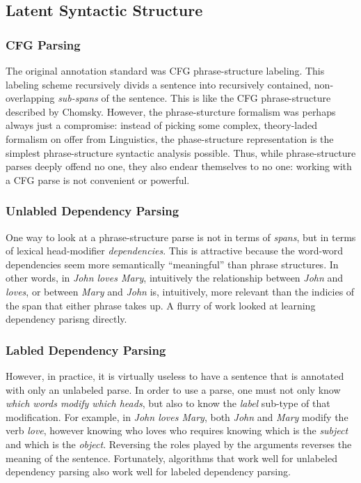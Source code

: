 \documentclass[12pt]{article}
\begin{document}
\subsection{Latent Syntactic Structure}
\subsubsection{CFG Parsing}
The original annotation standard was CFG phrase-structure labeling.
This labeling scheme recursively divids a sentence into recursively contained, non-overlapping {\em sub-spans} of the sentence.
This is like the CFG phrase-structure described by Chomsky.
However, the phrase-sturcture formalism was perhaps always just a compromise: instead of picking some complex, theory-laded formalism on offer from Linguistics, the phase-structure representation is the simplest phrase-structure syntactic analysis possible.
Thus, while phrase-structure parses deeply offend no one, they also endear themselves to no one: working with a CFG parse is not convenient or powerful.
\subsubsection{Unlabled Dependency Parsing}
One way to look at a phrase-structure parse is not in terms of {\em spans}, but in terms of lexical head-modifier {\em dependencies}.
This is attractive because the word-word dependencies seem more semantically ``meaningful'' than phrase structures.
In other words, in {\em John loves Mary}, intuitively the relationship between {\em John} and {\em loves}, or between {\em Mary} and {\em John} is, intuitively, more relevant than the indicies of the span that either phrase takes up.
A flurry of work looked at learning dependency parisng directly.
\subsubsection{Labled Dependency Parsing}
However, in practice, it is virtually useless to have a sentence that is annotated with only an unlabeled parse.
In order to use a parse, one must not only know {\em which words modify which heads}, but also to know the {\em label} sub-type of that modification.
For example, in {\em John loves Mary}, both {\em John} and {\em Mary} modify the verb {\em love}, however knowing who loves who requires knowing which is the {\em subject} and which is the {\em object}.
Reversing the roles played by the arguments reverses the meaning of the sentence.
Fortunately, algorithms that work well for unlabeled dependency parsing also work well for labeled dependency parsing.
\end{document}
